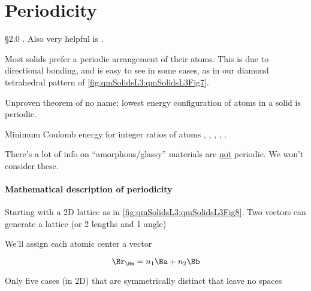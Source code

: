 %
%

\section{Periodicity}

\reading \S 2.0 \citep{ibach2009solid}.  Also very helpful is \citep{tung:bravais}.

Most solids prefer a periodic arrangement of their atoms.  This is due to directional bonding, and is easy to see in some cases, as in our diamond tetrahedral pattern of \cref{fig:qmSolidsL3:qmSolidsL3Fig7}.


Unproven theorem of no name: lowest energy configuration of atoms in a solid is periodic.

Minimum Coulomb energy for integer ratios of atoms
,
,
,
,
.

There's a lot of info on ``amorphous/glassy'' materials are \underline{not} periodic.  We won't consider these.

\paragraph{Mathematical description of periodicity}

Starting with a 2D lattice as in \cref{fig:qmSolidsL3:qmSolidsL3Fig8}.  Two vectors can generate a lattice (or 2 lengths and 1 angle)


We'll assign each atomic center a vector

\begin{dmath}\label{eqn:condensedMatterLecture3:100}
\Br_\Bn = n_1 \Ba + n_2 \Bb
\end{dmath}

Only five cases (in 2D) that are symmetrically distinct that leave no spaces

